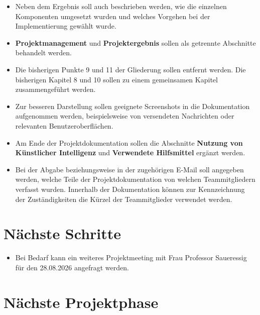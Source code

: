 \documentclass[a4paper,11pt]{article}
\begin{document}
\begin{itemize}[leftmargin=1.2cm]
\item Neben dem Ergebnis soll auch beschrieben werden, wie die einzelnen
Komponenten umgesetzt wurden und welches Vorgehen bei der Implementierung
gewählt wurde.

\item \textbf{Projektmanagement} und \textbf{Projektergebnis} sollen als
getrennte Abschnitte behandelt werden.

\item Die bisherigen Punkte 9 und 11 der Gliederung sollen entfernt werden. Die bisherigen Kapitel 8 und 10 sollen zu einem gemeinsamen Kapitel
zusammengeführt werden.

\item Zur besseren Darstellung sollen geeignete Screenshots
in die Dokumentation aufgenommen werden, beispielsweise von versendeten
Nachrichten oder relevanten Benutzeroberflächen.

\item Am Ende der Projektdokumentation sollen die Abschnitte
\textbf{Nutzung von Künstlicher Intelligenz} und
\textbf{Verwendete Hilfsmittel} ergänzt werden.

\item Bei der Abgabe beziehungsweise in der zugehörigen E-Mail soll angegeben
werden, welche Teile der Projektdokumentation von welchen Teammitgliedern
verfasst wurden. Innerhalb der Dokumentation können zur Kennzeichnung der
Zuständigkeiten die Kürzel der Teammitglieder verwendet werden.

\end{itemize}
\vspace{0.5cm}

\section{Nächste Schritte}

\begin{itemize}[leftmargin=1.2cm]

\item Bei Bedarf kann ein weiteres Projektmeeting mit Frau Professor
Saueressig für den 28.08.2026 angefragt werden.

\end{itemize}

\vspace{0.5cm}

\section{Nächste Projektphase}
\end{document}
